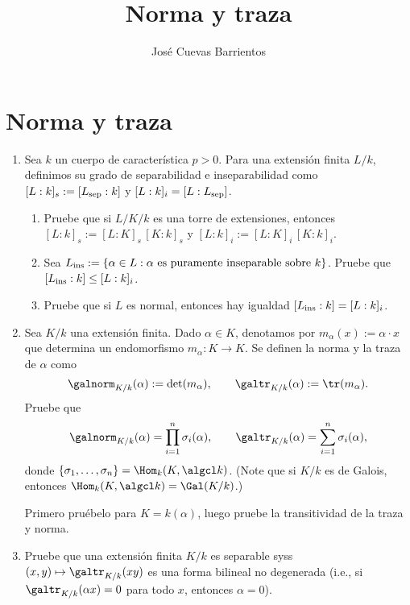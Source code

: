 \documentclass[11pt, reqno]{amsart}
\title{Norma y traza}
\date{\DTMdate{2025-08-27}}
\author{José Cuevas Barrientos}
\begin{document}
\maketitle

\section{Norma y traza}
\begin{enumerate}
	\item Sea $k$ un cuerpo de característica $p > 0$.
		Para una extensión finita $L/k$, definimos su grado de separabilidad e inseparabilidad como $[L : k]_s := [L_{\rm sep} : k]$
		y $[L : k]_i = [L : L_{\rm sep}]$.
		\begin{enumerate}
			\item Pruebe que si $L/K/k$ es una torre de extensiones, entonces $[L : k]_s := [L : K]_s \, [K : k]_s$ y $[L : k]_i
				:= [L : K]_i \, [K : k]_i$.
			\item Sea $L_{\rm ins} := \{ \alpha \in L : \alpha \text{ es puramente inseparable sobre } k \}$.
				Pruebe que $[L_{\rm ins} : k] \le [L : k]_i$.
			\item Pruebe que si $L$ es normal, entonces hay igualdad $[L_{\rm ins} : k] = [L : k]_i$.
		\end{enumerate}

		\newex
	\item\lookright
		Sea $K/k$ una extensión finita.
		Dado $\alpha \in K$, denotamos por $m_\alpha(x) := \alpha\cdot x$ que determina un endomorfismo $m_\alpha \colon K \to K$.
		Se definen la norma y la traza de $\alpha$ como
		\[
			\galnorm_{K/k}(\alpha) := \det(m_\alpha), \qquad \galtr_{K/k}(\alpha) := \tr(m_\alpha).
		\]
		Pruebe que
		\[
			\galnorm_{K/k}(\alpha) = \prod_{i=1}^n\sigma_i(\alpha), \qquad \galtr_{K/k}(\alpha) = \sum_{i=1}^n \sigma_i(\alpha),
		\]
		donde $\{ \sigma_1, \dots, \sigma_n \} = \Hom_k(K, \algcl k)$.
		(Note que si $K/k$ es de Galois, entonces $\Hom_k(K, \algcl k) = \Gal(K/k)$.)

		\begin{hint}
			Primero pruébelo para $K = k(\alpha)$, luego pruebe la transitividad de la traza y norma.
		\end{hint}

		\newex
	\item Pruebe que una extensión finita $K/k$ es separable syss $(x, y) \mapsto \galtr_{K/k}(xy)$ es una forma bilineal no degenerada
		(i.e., si $\galtr_{K/k}(\alpha x) = 0$ para todo $x$, entonces $\alpha = 0$).
\end{enumerate}
\end{document}
